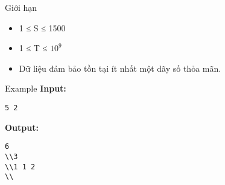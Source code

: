 Giới hạn
\begin{itemize}
	\item     1 ≤ S ≤ 1500   
	\item     1 ≤ T ≤ $10^{9}$
	\item     Dữ liệu đảm bảo tồn tại ít nhất một dãy số thỏa mãn.   
\end{itemize}
Example
\textbf{    Input:   }
\begin{verbatim}
5 2\end{verbatim}

\textbf{    Output:   }
\begin{verbatim}
6
\\3
\\1 1 2 
\\\end{verbatim}